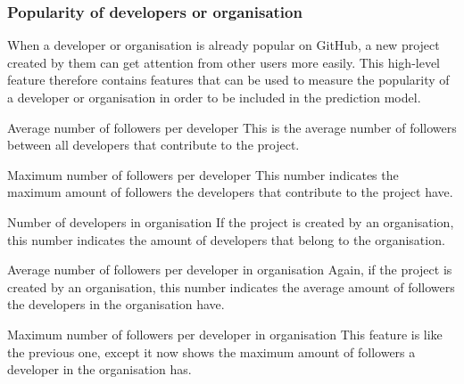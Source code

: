     \subsubsection{Popularity of developers or organisation}
    When a developer or organisation is already popular on GitHub, a new project created by them can get attention from other users more easily.
    This high-level feature therefore contains features that can be used to measure the popularity of a developer or organisation in order to be included in the prediction model.
    \begin{LaTeXdescription}
        \item[Average number of followers per developer]
        This is the average number of followers between all developers that contribute to the project.
        \item[Maximum number of followers per developer]
        This number indicates the maximum amount of followers the developers that contribute to the project have.
        \item[Number of developers in organisation]
        If the project is created by an organisation, this number indicates the amount of developers that belong to the organisation.
        \item[Average number of followers per developer in organisation]
        Again, if the project is created by an organisation, this number indicates the average amount of followers the developers in the organisation have.
        \item[Maximum number of followers per developer in organisation]
        This feature is like the previous one, except it now shows the maximum amount of followers a developer in the organisation has.
    \end{LaTeXdescription}




